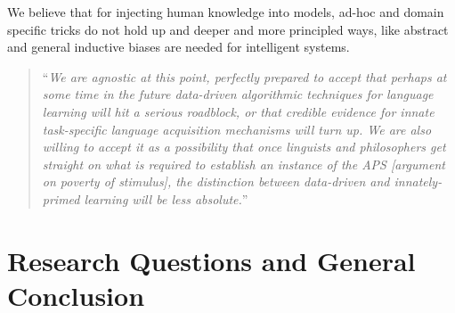 We believe that for injecting human knowledge into models, ad-hoc and domain specific tricks do not hold up and deeper and more principled ways, like abstract and general inductive biases are needed for intelligent systems.


\begin{quote}
``\emph{We are agnostic at this point, perfectly prepared to accept that
perhaps at some time in the future data-driven algorithmic techniques for language learning will hit a serious roadblock, or that credible evidence for innate
task-specific language acquisition mechanisms will turn up. We are also willing to accept it as a possibility that once linguists and philosophers get straight
on what is required to establish an instance of the APS [argument on poverty of stimulus], the distinction between data-driven and innately-primed learning will be less absolute.}''~\citep{pullum2002empirical}
\end{quote}


\section{Research Questions and General Conclusion}